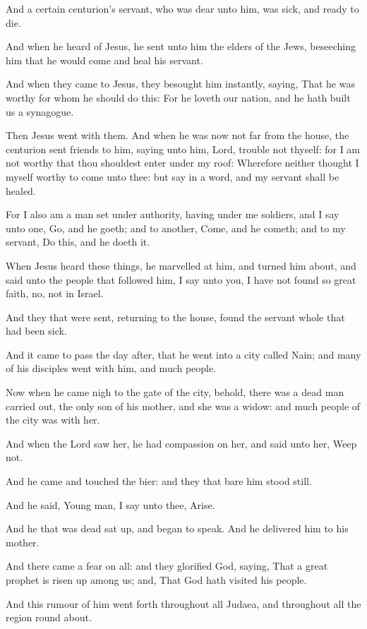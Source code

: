 \verse And a certain centurion's servant, who was dear unto him, was sick, and ready to die.

\verse And when he heard of Jesus, he sent unto him the elders of the Jews, beseeching him that he would come and heal his servant.

\verse And when they came to Jesus, they besought him instantly, saying, That he was worthy for whom he should do this: \verse For he loveth our nation, and he hath built us a synagogue.

\verse Then Jesus went with them. And when he was now not far from the house, the centurion sent friends to him, saying unto him, Lord, trouble not thyself: for I am not worthy that thou shouldest enter under my roof: \verse Wherefore neither thought I myself worthy to come unto thee: but say in a word, and my servant shall be healed.

\verse For I also am a man set under authority, having under me soldiers, and I say unto one, Go, and he goeth; and to another, Come, and he cometh; and to my servant, Do this, and he doeth it.

\verse When Jesus heard these things, he marvelled at him, and turned him about, and said unto the people that followed him, I say unto you, I have not found so great faith, no, not in Israel.

\verse And they that were sent, returning to the house, found the servant whole that had been sick.

\verse And it came to pass the day after, that he went into a city called Nain; and many of his disciples went with him, and much people.

\verse Now when he came nigh to the gate of the city, behold, there was a dead man carried out, the only son of his mother, and she was a widow: and much people of the city was with her.

\verse And when the Lord saw her, he had compassion on her, and said unto her, Weep not.

\verse And he came and touched the bier: and they that bare him stood still.

And he said, Young man, I say unto thee, Arise.

\verse And he that was dead sat up, and began to speak. And he delivered him to his mother.

\verse And there came a fear on all: and they glorified God, saying, That a great prophet is risen up among us; and, That God hath visited his people.

\verse And this rumour of him went forth throughout all Judaea, and throughout all the region round about.

